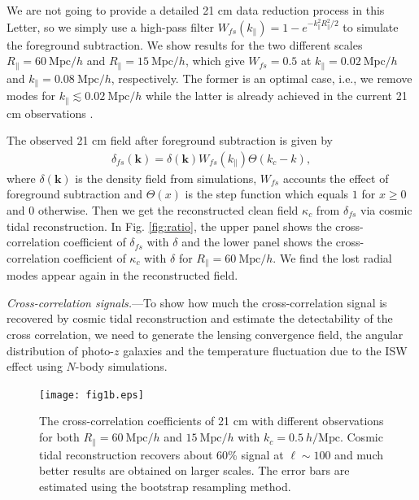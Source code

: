 \documentclass[aps,prl,twocolumn,showpacs,superscriptaddress,groupedaddress,nofootinbib,floatfix]{revtex4}  %
\newcommand{\mr}{\mathrm}
\begin{document}
We are not going to provide a detailed 21 cm data reduction process in this 
Letter, so we simply  use a high-pass filter 
$W_{fs}(k_\parallel)=1-e^{-k_\parallel^2R_\parallel^2/2}$ to simulate the 
foreground subtraction. We show results for the two different scales 
$R_\parallel=60\ \mr{Mpc}/h$ and $R_\parallel=15\ \mr{Mpc}/h$, which give
$W_{fs}=0.5$ at $k_\parallel=0.02\ \mr{Mpc}/h$ and 
$k_\parallel=0.08\ \mr{Mpc}/h$, respectively. The former is an optimal case, 
i.e., we remove modes for $k_\parallel\lesssim0.02\ \mr{Mpc}/h$ while the latter
is already achieved in the current 21 cm observations 
\cite{2013ApJ...763L..20M,2013MNRAS.434L..46S}.

The observed 21 cm field after foreground subtraction is given by 
\begin{eqnarray}
\delta_{fs}(\bm{k})=\delta(\bm{k})W_{fs}(k_\parallel)\Theta(k_c-k),
\end{eqnarray}
where $\delta(\bm{k})$ is the density field from simulations, $W_{fs}$ accounts
the effect of foreground subtraction and $\Theta(x)$ is the step function 
which equals $1$ for $x\ge0$ and $0$ otherwise.
Then we get the reconstructed clean field $\kappa_c$ from $\delta_{fs}$ via
cosmic tidal reconstruction. In Fig. \ref{fig:ratio}, the upper panel shows the 
cross-correlation coefficient of $\delta_{fs}$ with $\delta$ and the lower 
panel shows the cross-correlation coefficient of $\kappa_c$ with $\delta$ for 
$R_\parallel=60\ \mr{Mpc}/h$. 
We find the lost radial modes appear again in the reconstructed field.

{\it Cross-correlation signals.}---To show how much the cross-correlation signal
is recovered by cosmic tidal reconstruction and estimate the detectability of 
the cross correlation, we need to generate the lensing convergence field,
the angular distribution of photo-$z$ galaxies and the temperature fluctuation
due to the ISW effect using $N$-body simulations.

\begin{figure}[tbp]
\begin{center}
\texttt{[image: fig1b.eps]}
\end{center}
\vspace{-0.7cm}
\caption{The cross-correlation coefficients of 21 cm with different 
observations for both $R_\parallel=60\ \mr{Mpc}/h$ and $15\ \mr{Mpc}/h$ with 
$k_c=0.5\ h/\mr{Mpc}$. Cosmic tidal reconstruction recovers about 60\% signal 
at $\ell\sim100$ and much better results are obtained on larger scales. 
The error bars are estimated using the bootstrap resampling method.}
\label{fig:cc}
\end{figure}
\end{document}
